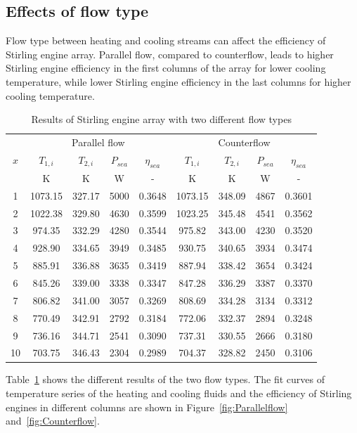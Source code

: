 \subsection{Effects of flow type}

Flow type between heating and cooling streams can affect the efficiency of Stirling engine array. Parallel flow, compared to counterflow, leads to higher Stirling engine efficiency in the first columns of the array for lower cooling temperature, while lower Stirling engine efficiency in the last columns for higher cooling temperature. 

\begin{table}[htbp]
	\caption{Results of Stirling engine array with two different flow types}
	\begin{center}
	\begin{tabular}{ccccccccc}
		\toprule
		\multirow{3}{*}{$x$}	&	\multicolumn{4}{c}{Parallel flow}	&\multicolumn{4}{c}{Counterflow}\tabularnewline
		\cline{2-5}	\cline{6-9}
		&$T_{1,i}$&$T_{2,i}$&$P_{sea}$&$\eta_{sea}$&$T_{1,i}$&$T_{2,i}$&$P_{sea}$&$\eta_{sea}$\tabularnewline
		&K&K&W&-&K&K&W&-\tabularnewline
		\midrule
		1	&	1073.15	&	327.17	&	5000	&	0.3648	&	1073.15	&	348.09	&	4867	&	0.3601\\
		2	&	1022.38	&	329.80	&	4630	&	0.3599	&	1023.25	&	345.48	&	4541	&	0.3562\\
		3	&	974.35	&	332.29	&	4280	&	0.3544	&	975.82	&	343.00	&	4230	&	0.3520\\
		4	&	928.90	&	334.65	&	3949	&	0.3485	&	930.75	&	340.65	&	3934	&	0.3474\\
		5	&	885.91	&	336.88	&	3635	&	0.3419	&	887.94	&	338.42	&	3654	&	0.3424\\
		6	&	845.26	&	339.00	&	3338	&	0.3347	&	847.28	&	336.29	&	3387	&	0.3370\\
		7	&	806.82	&	341.00	&	3057	&	0.3269	&	808.69	&	334.28	&	3134	&	0.3312\\
		8	&	770.49	&	342.91	&	2792	&	0.3184	&	772.06	&	332.37	&	2894	&	0.3248\\
		9	&	736.16	&	344.71	&	2541	&	0.3090	&	737.31	&	330.55	&	2666	&	0.3180\\
		10	&	703.75	&	346.43	&	2304	&	0.2989	&	704.37	&	328.82	&	2450	&	0.3106\\
		\bottomrule
	\end{tabular}
	\end{center}
	\label{tab:SEAresults}
\end{table}

Table~\ref{tab:SEAresults} shows the different results of the two flow types. The fit curves of temperature series of the heating and cooling fluids and the efficiency of Stirling engines in different columns are shown in Figure~\ref{fig:Parallelflow}
and~\ref{fig:Counterflow}.

